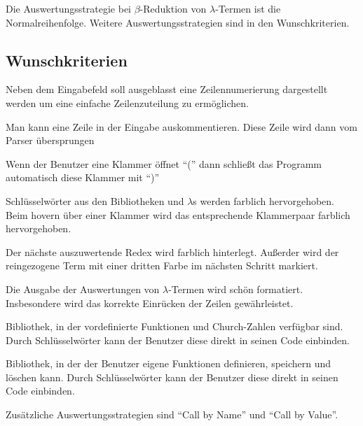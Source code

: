 \documentclass[parskip=full,11pt,twoside]{scrartcl}
\begin{document}
Die Auswertungsstrategie bei $\beta$-Reduktion von $\lambda$-Termen ist die Normalreihenfolge. Weitere Auswertungsstrategien sind in den Wunschkriterien.


\newpage
\subsection{Wunschkriterien}

Neben dem Eingabefeld soll ausgeblasst eine Zeilennumerierung dargestellt werden um eine einfache Zeilenzuteilung zu ermöglichen.

Man kann eine Zeile in der Eingabe auskommentieren. Diese Zeile wird dann vom Parser übersprungen

Wenn der Benutzer eine Klammer öffnet \enquote{(} dann schließt das Programm automatisch diese Klammer mit \enquote{)}

Schlüsselwörter aus den Bibliotheken und $\lambda$s werden farblich hervorgehoben. Beim hovern über einer Klammer wird das entsprechende Klammerpaar farblich hervorgehoben.

Der nächste auszuwertende Redex wird farblich hinterlegt. 
Außerder wird der reingezogene Term mit einer dritten Farbe im nächsten Schritt markiert.

Die Ausgabe der Auswertungen von $\lambda$-Termen wird schön formatiert. Insbesondere wird das korrekte Einrücken der Zeilen gewährleistet.

Bibliothek, in der vordefinierte Funktionen und Church-Zahlen verfügbar sind. Durch Schlüsselwörter kann der Benutzer diese direkt in seinen Code einbinden.

Bibliothek, in der der Benutzer eigene Funktionen definieren, speichern und löschen kann. Durch Schlüsselwörter kann der Benutzer diese direkt in seinen Code einbinden.

Zusätzliche Auswertungsstrategien sind \enquote{Call by Name} und \enquote{Call by Value}.
\end{document}
